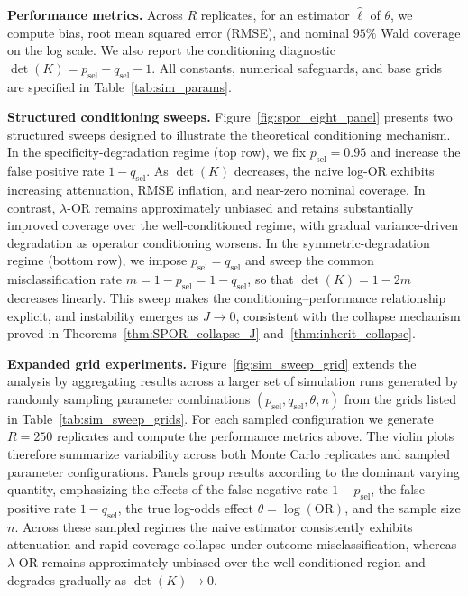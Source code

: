 \documentclass[pdflatex,sn-mathphys-num]{sn-jnl}%
\newcommand{\SPOR}{\textrm{$\lambda$-OR}}
\theoremstyle{thmstyleone}%
\theoremstyle{thmstyletwo}%
\theoremstyle{thmstylethree}%
\begin{document}
\textbf{Performance metrics.}
Across \(R\) replicates, for an estimator \(\widehat\ell\) of \(\theta\),
we compute bias, root mean squared error (RMSE), and nominal \(95\%\) Wald coverage on the log scale.
We also report the conditioning diagnostic
\(\det(K)=p_{\mathrm{sel}}+q_{\mathrm{sel}}-1\).
All constants, numerical safeguards, and base grids are specified in
Table~\ref{tab:sim_params}.

\textbf{Structured conditioning sweeps.}
Figure~\ref{fig:spor_eight_panel} presents two structured sweeps designed to
illustrate the theoretical conditioning mechanism.
In the specificity-degradation regime (top row),
we fix \(p_{\mathrm{sel}}=0.95\) and increase the false positive rate
\(1-q_{\mathrm{sel}}\).
As \(\det(K)\) decreases, the naive log-OR exhibits increasing attenuation,
RMSE inflation, and near-zero nominal coverage.
In contrast, \(\SPOR\) remains approximately unbiased and retains
substantially improved coverage over the well-conditioned regime,
with gradual variance-driven degradation as operator conditioning worsens.
In the symmetric-degradation regime (bottom row),
we impose \(p_{\mathrm{sel}}=q_{\mathrm{sel}}\) and sweep the common
misclassification rate
\(m=1-p_{\mathrm{sel}}=1-q_{\mathrm{sel}}\),
so that
\(\det(K)=1-2m\) decreases linearly.
This sweep makes the conditioning--performance relationship explicit,
and instability emerges as \(J\to0\),
consistent with the collapse mechanism proved in
Theorems~\ref{thm:SPOR_collapse_J} and~\ref{thm:inherit_collapse}.

\textbf{Expanded grid experiments.}
Figure~\ref{fig:sim_sweep_grid} extends the analysis by aggregating results
across a larger set of simulation runs generated by randomly sampling
parameter combinations
\((p_{\mathrm{sel}},q_{\mathrm{sel}},\theta,n)\)
from the grids listed in Table~\ref{tab:sim_sweep_grids}.
For each sampled configuration we generate \(R=250\) replicates and compute
the performance metrics above.
The violin plots therefore summarize variability across both Monte Carlo
replicates and sampled parameter configurations.
Panels group results according to the dominant varying quantity,
emphasizing the effects of the false negative rate \(1-p_{\mathrm{sel}}\),
the false positive rate \(1-q_{\mathrm{sel}}\),
the true log-odds effect \(\theta=\log(\mathrm{OR})\),
and the sample size \(n\).
Across these sampled regimes the naive estimator consistently exhibits
attenuation and rapid coverage collapse under outcome misclassification,
whereas \(\SPOR\) remains approximately unbiased over the well-conditioned
region and degrades gradually as \(\det(K)\to0\).
\end{document}
